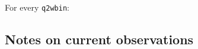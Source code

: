 \documentclass{article}
\numberwithin{equation}{subsection}
\begin{document}
For every \verb|q2wbin|:


\subsection{Notes on current observations}








\end{document}
